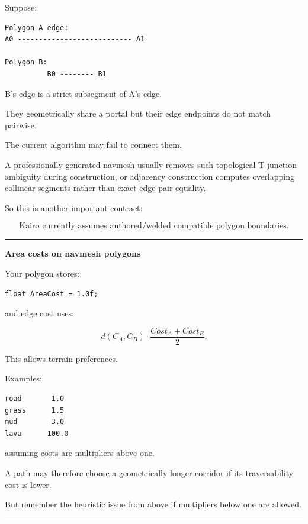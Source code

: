 Suppose:

\begin{verbatim}
Polygon A edge:
A0 --------------------------- A1

Polygon B:
          B0 -------- B1
\end{verbatim}

B's edge is a strict subsegment of A's edge.

They geometrically share a portal but their edge endpoints do not match pairwise.

The current algorithm may fail to connect them.

A professionally generated navmesh usually removes such topological T-junction ambiguity during construction, or adjacency construction computes overlapping collinear segments rather than exact edge-pair equality.

So this is another important contract:

\[
\boxed{
\text{Kairo currently assumes authored/welded compatible polygon boundaries}.
}
\]

\begin{center}\rule{0.5\linewidth}{0.5pt}\end{center}

\textbf{Area costs on navmesh polygons}

Your polygon stores:

\begin{verbatim}
float AreaCost = 1.0f;
\end{verbatim}

and edge cost uses:

\[
d(C_A,C_B)
\cdot
\frac{Cost_A+Cost_B}{2}.
\]

This allows terrain preferences.

Examples:

\begin{verbatim}
road       1.0
grass      1.5
mud        3.0
lava      100.0
\end{verbatim}

assuming costs are multipliers above one.

A path may therefore choose a geometrically longer corridor if its traversability cost is lower.

But remember the heuristic issue from above if multipliers below one are allowed.

\begin{center}\rule{0.5\linewidth}{0.5pt}\end{center}

